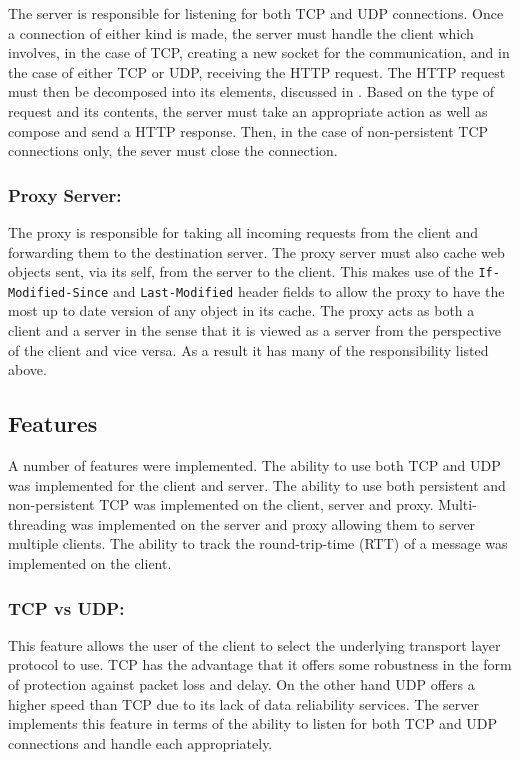 \documentclass[10pt,twocolumn]{witseiepaper}
\begin{document}
	The server is responsible for listening for both TCP and UDP connections. Once a connection of either kind is made, the server must handle the client which involves, in the case of TCP, creating a new socket for the communication, and in the case of either TCP or UDP, receiving the HTTP request. The HTTP request must then be decomposed into its elements, discussed in . Based on the type of request and its contents, the server must take an appropriate action as well as compose and send a HTTP response. Then, in the case of non-persistent TCP connections only, the sever must close the connection.

	\subsubsection{Proxy Server:}

	The proxy is responsible for taking all incoming requests from the client and forwarding them to the destination server. The proxy server must also cache web objects sent, via its self, from the server to the client. This makes use of the \texttt{If-Modified-Since} and \texttt{Last-Modified} header fields to allow the proxy to have the most up to date version of any object in its cache. The proxy acts as both a client and a server in the sense that it is viewed as a server from the perspective of the client and vice versa. As a result it has many of the responsibility listed above.

\subsection{Features}

A number of features were implemented. The ability to use both TCP and UDP was implemented for the client and server. The ability to use both persistent and non-persistent TCP was implemented on the client, server and proxy. Multi-threading was implemented on the server and proxy allowing them to server multiple clients. The ability to track the round-trip-time (RTT) of a message was implemented on the client.

	\subsubsection{TCP vs UDP:}

	This feature allows the user of the client to select the underlying transport layer protocol to use. TCP has the advantage that it offers some robustness in the form of protection against packet loss and delay. On the other hand UDP offers a higher speed than TCP due to its lack of data reliability services. The server implements this feature in terms of the ability to listen for both TCP and UDP connections and handle each appropriately. 
\end{document}
